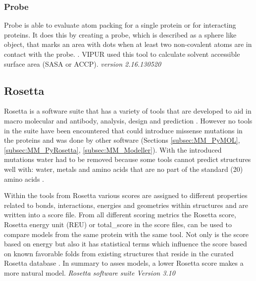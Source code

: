 \subsubsection{Probe}
Probe is able to evaluate atom packing for a single protein or for interacting proteins. It does this by creating a probe, which is described as a sphere like object, that marks an area with dots when at least two non-covalent atoms are in contact with the probe. \cite{word_visualizing_1999, richardson_lab_probe_nodate}. VIPUR used this tool to calculate solvent accessible surface area (SASA or ACCP).
\label{subsec:MM_Probe}
\newline
\textit{version 2.16.130520}

\subsection{Rosetta}
Rosetta is a software suite that has a variety of tools that are developed to aid in macro molecular and antibody, analysis, design and prediction \cite{rosetta_commons_about_nodate}.
However no tools in the suite have been encountered that could introduce missense mutations in the proteins and was done by other software (Sections \ref{subsec:MM_PyMOL}, \ref{subsec:MM_PyRosetta}, \ref{subsec:MM_Modeller}). With the introduced mutations water had to be removed because some tools cannot predict structures well with: water, metals and amino acids that are no part of the standard (20) amino acids \cite{rosetta_commons_how_nodate}.

Within the tools from Rosetta various scores are assigned to different properties related to bonds, interactions, energies and geometries within structures and are written into a score file. 
From all different scoring metrics the Rosetta score, Rosetta energy unit (REU) or total\_score in the score files, can be used to compare models from the same protein with the same tool. 
Not only is the score based on energy but also it has statistical terms which influence the score based on known favorable folds from existing structures that reside in the curated Rosetta database \cite{shourya_scoring_nodate}. 
In summary to asses models, a lower Rosetta score makes a more natural model.
\label{subsec:MM_Rosetta}
\newline
\textit{Rosetta software suite Version 3.10}

